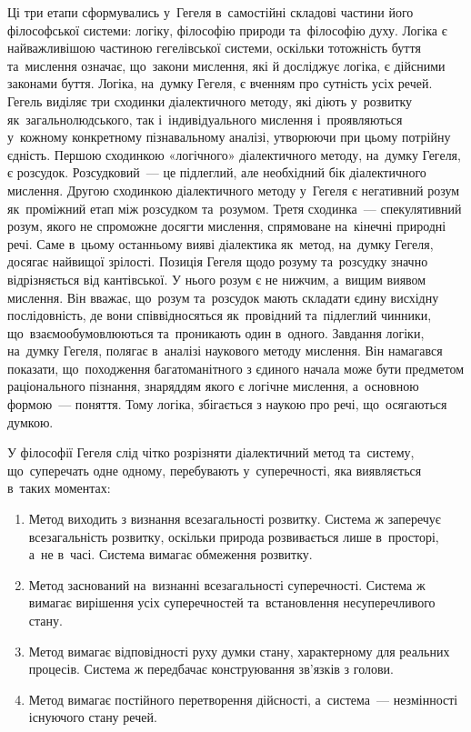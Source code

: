 \documentclass[a5paper,oneside,DIV=12,12pt,headings=small]{scrartcl}
\begin{document}
		Ці три етапи сформувались у~Гегеля в~самостійні складові частини його філософської системи: логіку, філософію природи та~філософію духу. Логіка є найважливішою частиною гегелівської системи, оскільки тотожність буття та~мислення означає, що~закони мислення, які й досліджує логіка, є дійсними законами буття. Логіка, на~думку Гегеля, є вченням про сутність усіх речей. Гегель виділяє три сходинки діалектичного методу, які діють у~розвитку як~загальнолюдського, так і~індивідуального мислення і~проявляються у~кожному конкретному пізнавальному аналізі, утворюючи при цьому потрійну єдність. Першою сходинкою «логічного» діалектичного методу, на~думку Гегеля, є розсудок. Розсудковий~— це підлеглий, але необхідний бік діалектичного мислення. Другою сходинкою діалектичного методу у~Гегеля є негативний розум як~проміжний етап між розсудком та~розумом. Третя сходинка~— спекулятивний розум, якого не спроможне досягти мислення, спрямоване на~кінечні природні речі. Саме в~цьому останньому вияві діалектика як~метод, на~думку Гегеля, досягає найвищої зрілості. Позиція Гегеля щодо розуму та~розсудку значно відрізняється від кантівської. У нього розум є не нижчим, а~вищим виявом мислення. Він вважає, що~розум та~розсудок мають складати єдину висхідну послідовність, де вони співвідносяться як~провідний та~підлеглий чинники, що~взаємообумовлюються та~проникають один в~одного. Завдання логіки, на~думку Гегеля, полягає в~аналізі наукового методу мислення. Він намагався показати, що~походження багатоманітного з єдиного начала може бути предметом раціонального пізнання, знаряддям якого є логічне мислення, а~основною формою~— поняття. Тому логіка, збігається з наукою про речі, що~осягаються думкою. 
	
		У філософії Гегеля слід чітко розрізняти діалектичний метод та~систему, що~суперечать одне одному, перебувають у~суперечності, яка виявляється в~таких моментах:
		\begin{enumerate}
			\item Метод виходить з визнання всезагальності розвитку. Система ж заперечує всезагальність розвитку, оскільки природа розвивається лише в~просторі, а~не в~часі. Система вимагає обмеження розвитку.
			\item Метод заснований на~визнанні всезагальності суперечності. Система ж вимагає вирішення усіх суперечностей та~встановлення несуперечливого стану.
			\item Метод вимагає відповідності руху думки стану, характерному для реальних процесів. Система ж передбачає конструювання зв'язків з голови.
			\item Метод вимагає постійного перетворення дійсності, а~система~— незмінності існуючого стану речей.
		\end{enumerate}
		
\end{document}
